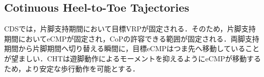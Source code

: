 \documentclass[twocolumn]{jsarticle}
\begin{document}
\subsection{Cotinuous Heel-to-Toe Tajectories}
CDSでは，片脚支持期間において目標VRPが固定される．そのため，片脚支持期間においてeCMPが固定され，CoPの許容できる範囲が固定される．両脚支持期間から片脚期間へ切り替える瞬間に，目標eCMPはつま先へ移動していることが望ましい．CHTは遊脚動作によるモーメントを抑えるようにeCMPが移動するため，より安定な歩行動作を可能とする．%
\end{document}
